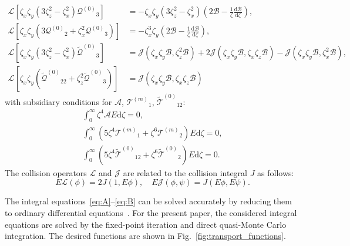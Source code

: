 \documentclass[final]{jfm} %
\newcommand{\dd}{\mathrm{d}}
\newcommand{\der}[2][]{\frac{\dd#1}{\dd#2}}
\newcommand{\Q}{\ensuremath{\mathcal{Q}^{(0)}}}
\newcommand{\T}[1]{\ensuremath{\mathcal{T}^{(#1)}}}
\newcommand{\TT}{\ensuremath{\tilde{\mathcal{T}}^{(0)}}}
\newcommand{\QQ}{\ensuremath{\tilde{\mathcal{Q}}^{(0)}}}
\begin{document}
\begin{align}
    \mathcal{L}\left[ \zeta_x\zeta_y \left( 3\zeta_z^2-\zeta_x^2 \right)\Q_3 \right]
        &= -\zeta_x\zeta_y\left( 3\zeta_z^2-\zeta_x^2 \right)\left(2\mathcal{B} - \frac1\zeta\der[\mathcal{B}]{\zeta}\right), \label{eq:Q3}\\
    \mathcal{L}\left[ \zeta_x\zeta_y \left( 3\Q_2+\zeta_x^2\Q_3 \right) \right]
        &= -\zeta_x^3\zeta_y\left(2\mathcal{B} - \frac1\zeta\der[\mathcal{B}]{\zeta}\right), \label{eq:Q2}\\
    \mathcal{L}\left[ \zeta_x\zeta_y\left( 3\zeta_z^2 - \zeta_x^2 \right)\QQ_3 \right]
        &= \mathcal{J}\left( \zeta_x\zeta_y\mathcal{B}, \zeta_z^2\mathcal{B} \right)
        + 2\mathcal{J}\left( \zeta_x\zeta_y\mathcal{B}, \zeta_x\zeta_z\mathcal{B} \right)
        - \mathcal{J}\left( \zeta_x\zeta_y\mathcal{B}, \zeta_x^2\mathcal{B} \right), \label{eq:QQ3}\\
    \mathcal{L}\left[ \zeta_x\zeta_y \left( \QQ_{22} + \zeta_z^2\QQ_3 \right) \right]
        &= \mathcal{J}\left( \zeta_x\zeta_y\mathcal{B}, \zeta_x\zeta_z\mathcal{B} \right) \label{eq:QQ2}
\end{align}
with subsidiary conditions for \(\mathcal{A}\), \(\T{m}_1\), \(\TT_{12}\):
\begin{gather}
    \int_0^\infty \zeta^4 \mathcal{A} E \dd\zeta = 0, \label{eq:A_constraint}\\
    \int_0^\infty \left( 5\zeta^4\T{m}_1 + \zeta^6\T{m}_2 \right) E \dd\zeta = 0, \label{eq:Tm_constraint}\\
    \int_0^\infty \left( 5\zeta^4\TT_{12} + \zeta^6\TT_2 \right) E \dd\zeta = 0. \label{eq:T12_constraint}
\end{gather}
The collision operators \(\mathcal{L}\) and \(\mathcal{J}\) are related to the collision integral \(J\) as follows:
\begin{equation}\label{eq:mathcalLJ}
    E\mathcal{L}(\phi) = 2J(1, E\phi), \quad E\mathcal{J}(\phi, \psi) = J(E\phi, E\psi).
\end{equation}

The integral equations~\eqref{eq:A}--\eqref{eq:B} can be solved accurately
by reducing them to ordinary differential equations~\citep[see e.g.][]{Pekeris1957, Ohwada1992}.
For the present paper, the considered integral equations are solved
by the fixed-point iteration and direct quasi-Monte Carlo integration.
The desired functions are shown in Fig.~\ref{fig:transport_functions}.
\end{document}
